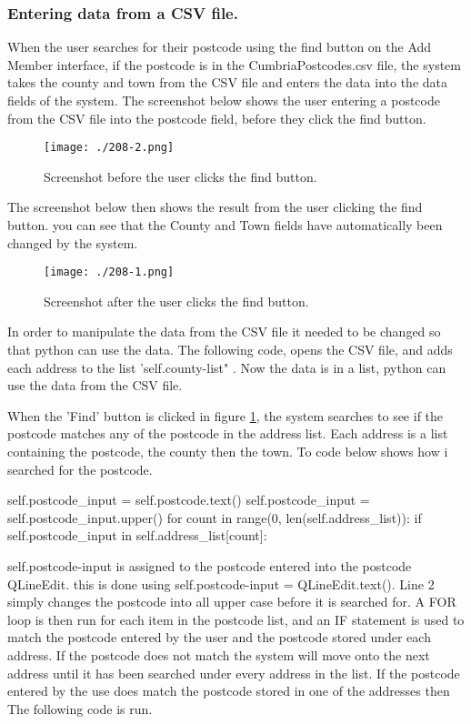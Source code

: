 \begin{python}
\pagebreak

\subsubsection{Entering data from a CSV file.}
When the user searches for their postcode using the find button on the Add Member interface, if the postcode is in the CumbriaPostcodes.csv file, the system takes the county and town from the CSV file and enters the data into the data fields of the system. The screenshot below shows the user entering a postcode from the CSV file into the postcode field, before they click the find button.

\begin{figure}[H]
\caption{Screenshot before the user clicks the find button.} \label{fig:find-postcode}
\texttt{[image: ./208-2.png]}
\end{figure}

The screenshot below then shows the result from the user clicking the find button. you can see that the County and Town fields have automatically been changed by the system.

\begin{figure}[H]
\caption{Screenshot after the user clicks the find button.} \label{fig:found-postcode}
\texttt{[image: ./208-1.png]}
\end{figure}

In order to manipulate the data from the CSV file it needed to be changed so that python can use the data. The following code, opens the CSV file, and adds each address to the list 'self.county-list" . Now the data is in a list, python can use the data from the CSV file. 

When the 'Find' button is clicked in figure \ref{fig:find-postcode}, the system searches to see if the postcode matches any of the postcode in the address list. Each address is a list containing the postcode, the county then the town. To code below shows how i searched for the postcode.

\begin{python}
self.postcode_input = self.postcode.text()
self.postcode_input = self.postcode_input.upper()
for count in range(0, len(self.address_list)):
	if self.postcode_input in self.address_list[count]:
\end{python}

self.postcode-input is assigned to the postcode entered into the postcode QLineEdit. this is done using self.postcode-input = QLineEdit.text(). Line 2 simply changes the postcode into all upper case before it is searched for. A FOR loop is then run for each item in the postcode list, and an IF statement is used to match the postcode entered by the user and the postcode stored under each address. If the postcode does not match the system will move onto the next address until it has been searched under every address in the list. If the postcode entered by the use does match the postcode stored in one of the addresses then The following code is run.


\end{python}
